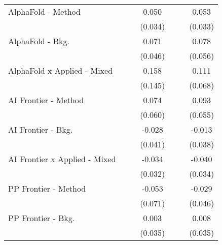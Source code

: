 \begin{tabular}{lcccccc}
   AlphaFold - Method             &               &             & 0.050        &               &               & 0.053\\   
                                  &               &             & (0.034)      &               &               & (0.033)\\   
   AlphaFold - Bkg.               &               &             & 0.071        &               &               & 0.078\\   
                                  &               &             & (0.046)      &               &               & (0.056)\\   
   AlphaFold x Applied - Mixed    &               &             & 0.158        &               &               & 0.111\\   
                                  &               &             & (0.145)      &               &               & (0.068)\\   
   AI Frontier - Method           &               &             & 0.074        &               &               & 0.093\\   
                                  &               &             & (0.060)      &               &               & (0.055)\\   
   AI Frontier - Bkg.             &               &             & -0.028       &               &               & -0.013\\   
                                  &               &             & (0.041)      &               &               & (0.038)\\   
   AI Frontier x Applied - Mixed  &               &             & -0.034       &               &               & -0.040\\   
                                  &               &             & (0.032)      &               &               & (0.034)\\   
   PP Frontier - Method           &               &             & -0.053       &               &               & -0.029\\   
                                  &               &             & (0.071)      &               &               & (0.046)\\   
   PP Frontier - Bkg.             &               &             & 0.003        &               &               & 0.008\\   
                                  &               &             & (0.035)      &               &               & (0.035)\\   

\end{tabular}
